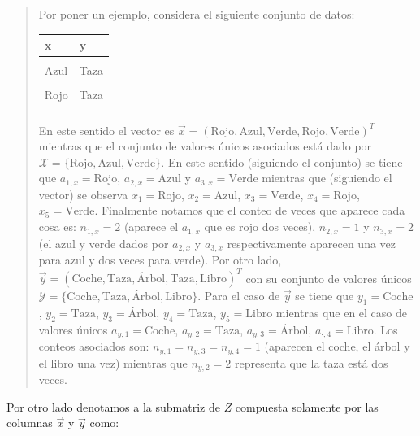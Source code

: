 \documentclass[
]{book}
\begin{document}
\begin{quote}
Por poner un ejemplo, considera el siguiente conjunto de datos:

\begin{table}
\centering
\begin{tabular}{l|l}
\hline
x & y\\
\hline
\cellcolor{gray!6}{Rojo} & \cellcolor{gray!6}{Coche}\\
\hline
Azul & Taza\\
\hline
\cellcolor{gray!6}{Verde} & \cellcolor{gray!6}{Árbol}\\
\hline
Rojo & Taza\\
\hline
\cellcolor{gray!6}{Verde} & \cellcolor{gray!6}{Libro}\\
\hline
\end{tabular}
\end{table}

En este sentido el vector es \(\vec{x} = (\text{Rojo},\text{Azul},\text{Verde},\text{Rojo},\text{Verde})^T\) mientras que el conjunto de valores únicos asociados está dado por \(\mathcal{X} = \{ \text{Rojo},\text{Azul},\text{Verde} \}\). En este sentido (siguiendo el conjunto) se tiene que \(a_{1,x} = \text{Rojo}\), \(a_{2,x} = \text{Azul}\) y \(a_{3,x } = \text{Verde}\) mientras que (siguiendo el vector) se observa \(x_1 = \text{Rojo}\), \(x_2 = \text{Azul}\), \(x_3 = \text{Verde}\), \(x_4 = \text{Rojo}\), \(x_5 = \text{Verde}\). Finalmente notamos que el conteo de veces que aparece cada cosa es: \(n_{1,x} = 2\) (aparece el \(a_{1, x}\) que es rojo dos veces), \(n_{2,x} = 1\) y \(n_{3,x } = 2\) (el azul y verde dados por \(a_{2,x}\) y \(a_{3,x}\) respectivamente aparecen una vez para azul y dos veces para verde). Por otro lado, \(\vec{y} = (\text{Coche},\text{Taza},\text{Árbol},\text{Taza},\text{Libro})^T\) con su conjunto de valores únicos \(\mathcal{Y} = \{ \text{Coche},\text{Taza},\text{Árbol}, \text{Libro} \}\). Para el caso de \(\vec{y}\) se tiene que \(y_1 = \text{Coche}\), \(y_2 = \text{Taza}\), \(y_3 = \text{Árbol}\), \(y_4 = \text{Taza}\), \(y_5 = \text{Libro}\) mientras que en el caso de valores únicos \(a_{y, 1} = \text{Coche}\), \(a_{y, 2} = \text{Taza}\), \(a_{y, 3} = \text{Árbol}\), \(a_{\cdot, 4} = \text{Libro}\). Los conteos asociados son: \(n_{y,1} = n_{y,3} = n_{y,4} = 1\) (aparecen el coche, el árbol y el libro una vez) mientras que \(n_{y,2} = 2\) representa que la taza está dos veces.
\end{quote}

Por otro lado denotamos a la submatriz de \(Z\) compuesta solamente por las columnas \(\vec{x}\) y \(\vec{y}\) como:
\end{document}
